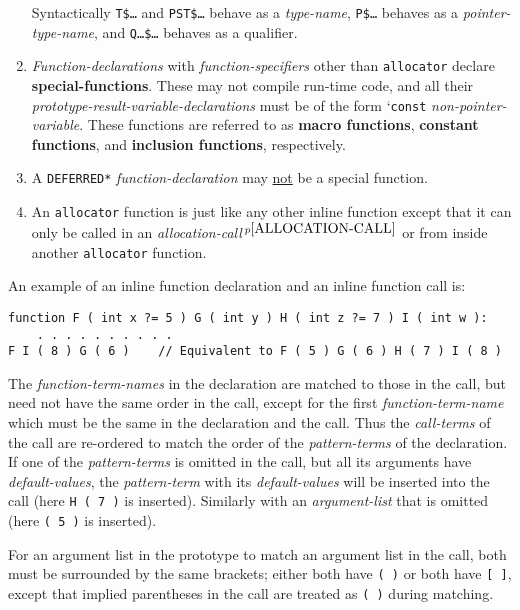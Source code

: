 \documentclass[12pt]{article}
\newcommand{\skey}[2]{{\rm \bfseries #1#2}}
\newcommand{\pagnote}[1]{$\,^{p\pageref{#1}}$}
\newenvironment{indpar}[1][0.3in]%
	{\begin{list}{}%
		     {\setlength{\itemsep}{0in}%
		      \setlength{\topsep}{0in}%
		      \setlength{\parsep}{1ex}%
		      \setlength{\labelwidth}{#1}%
		      \setlength{\leftmargin}{#1}%
		      \addtolength{\leftmargin}{\labelsep}}%
	 \item}%
	{\end{list}}
\begin{document}
\begin{enumerate}
Syntactically {\tt T\$\ldots} and {\tt PST\$\ldots} behave as
a {\em type-name},
{\tt P\$\ldots} behaves as a {\em pointer-type-name},
and {\tt Q\ldots\$\ldots} behaves as a qualifier.
\item
{\em Function-declarations} with {\em function-specifiers} other
than {\tt allocator} declare
\skey{special-function}s.  These may not compile run-time code,
and all their {\em prototype-result-variable-declarations}
must be of the form `{\tt const} {\em non-pointer-variable}.
These functions are referred to as \skey{macro function}s,
\skey{constant function}s, and \skey{inclusion function}s, respectively.
\item
A {\tt *DEFERRED*} {\em function-declaration} may \underline{not} be
a special function.
\item
An {\tt allocator} function\label{ALLOCATOR-FUNCTION}
is just like any other inline function
except that it can only be called in
an {\em allocation-call}\pagnote{ALLOCATION-CALL}
or from inside another {\tt allocator} function.

\end{enumerate}

An example of an inline function declaration and an inline function call is:
\begin{indpar}\begin{verbatim}
function F ( int x ?= 5 ) G ( int y ) H ( int z ?= 7 ) I ( int w ):
    . . . . . . . . . .
F I ( 8 ) G ( 6 )    // Equivalent to F ( 5 ) G ( 6 ) H ( 7 ) I ( 8 )
\end{verbatim}\end{indpar}

The {\em function-term-names} in the declaration are matched to those
in the call, but need not have the same order in the call, except for
the first {\em function-term-name} which must be the same in the
declaration and the call.  Thus the {\em call-terms} of the call
are re-ordered to match the order of the {\em pattern-terms} of the
declaration.  If one of the {\em pattern-terms} is omitted in the
call, but all its arguments have {\em default-values},
the {\em pattern-term} with its
{\em default-values} will be inserted into the call
(here {\tt H ( 7 )} is inserted).
Similarly with an {\em argument-list} that is omitted
(here {\tt ( 5 )} is inserted).

For an argument
list in the prototype to match an argument list in the call, both
must be surrounded by the same brackets; either both have {\tt (~)}
or both have {\tt [~]}, except that implied parentheses in the
call are treated as {\tt (~)} during matching.
\end{document}
